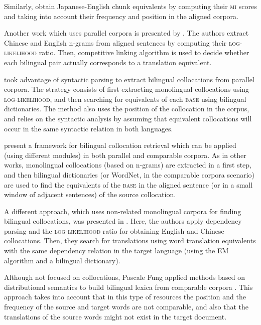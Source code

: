 \documentclass[output=paper
,modfonts
,nonflat]{langsci/langscibook}
\begin{document}
Similarly, \citet{haruno1996} obtain Japanese-English chunk equivalents by computing
their \textsc{mi} scores and taking into account their frequency and position in the aligned corpora.

Another work which uses parallel corpora is presented by \citet{wu2003}. The authors
extract Chinese and English n-grams from aligned sentences by computing their \textsc{log-likelihood} ratio.
Then, competitive linking algorithm is used to decide whether each bilingual pair actually
corresponds to a translation equivalent.

\citet{seretan2007} took advantage of syntactic parsing to extract bilingual collocations from parallel corpora.
The strategy consists of first extracting monolingual collocations using \textsc{log-likelihood},
and then searching for equivalents of each \textsc{base} using bilingual dictionaries.
The method also uses the position of the collocation in the corpus, and relies on the syntactic analysis
by assuming that equivalent collocations will occur in the same syntactic relation in both languages.

\citet{Rivera2013} present a framework for bilingual collocation retrieval
which can be applied (using different modules) in both parallel and comparable corpora.
As in other works, monolingual collocations (based on n-grams) are extracted in a first
step, and then bilingual dictionaries (or WordNet, in the comparable corpora scenario) are used
to find the equivalents of the \textsc{base} in the aligned sentence (or in a small window of
adjacent sentences) of the source collocation.

A different approach, which uses non-related monolingual corpora for finding bilingual
collocations, was presented in \citet{lu2004}. Here, the authors apply dependency parsing
and the \textsc{log-likelihood} ratio for obtaining English and Chinese collocations. Then,
they search for translations using word translation equivalents with the same dependency
relation in the target language (using the EM algorithm and a bilingual dictionary).

Although not focused on collocations, Pascale Fung applied methods based on distributional
semantics to build bilingual lexica from comparable corpora \citep{fung1998}.
This approach takes into account that in this type of resources the position and the frequency
of the source and target words are not comparable, and also that the translations of the source
words might not exist in the target document.
\end{document}
